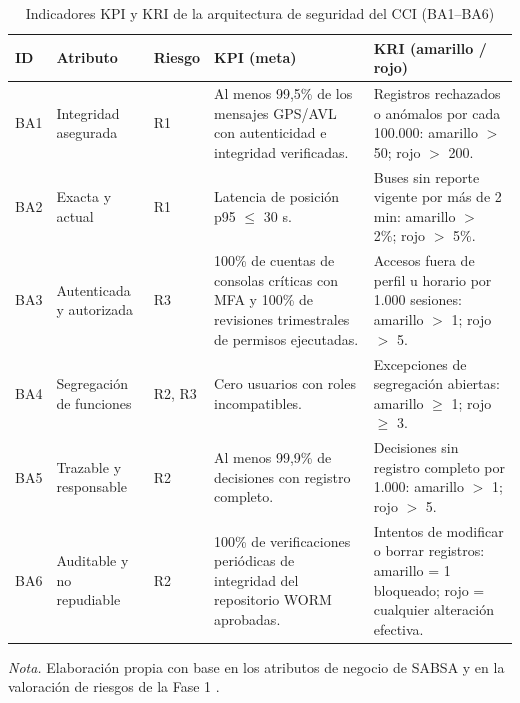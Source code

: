 \begin{table}[H]
	\centering
	\caption{Indicadores KPI y KRI de la arquitectura de seguridad del CCI (BA1--BA6)}
	\label{tab:kpi_kri_1}
	
	\begingroup
	\scriptsize
	\setlength{\tabcolsep}{3pt}
	\renewcommand{\arraystretch}{1.12}
	
	\begin{tabularx}{\textwidth}{
			>{\centering\arraybackslash}p{0.8cm}
			>{\raggedright\arraybackslash}p{2.0cm}
			>{\centering\arraybackslash}p{1.4cm}
			Y
			Y}
		
		\toprule
		\textbf{ID} &
		\textbf{Atributo} &
		\textbf{Riesgo} &
		\textbf{KPI (meta)} &
		\textbf{KRI (amarillo / rojo)} \\
		\midrule
		
		BA1 &
		Integridad asegurada &
		R1 &
		Al menos 99,5\% de los mensajes GPS/AVL con autenticidad e integridad verificadas. &
		Registros rechazados o anómalos por cada 100.000: amarillo $>$ 50; rojo $>$ 200. \\
		
		\addlinespace[2pt]
		
		BA2 &
		Exacta y actual &
		R1 &
		Latencia de posición p95 $\leq$ 30 s. &
		Buses sin reporte vigente por más de 2 min: amarillo $>$ 2\%; rojo $>$ 5\%. \\
		
		\addlinespace[2pt]
		
		BA3 &
		Autenticada y autorizada &
		R3 &
		100\% de cuentas de consolas críticas con MFA y 100\% de revisiones trimestrales
		de permisos ejecutadas. &
		Accesos fuera de perfil u horario por 1.000 sesiones: amarillo $>$ 1; rojo $>$ 5. \\
		
		\addlinespace[2pt]
		
		BA4 &
		Segregación de funciones &
		R2, R3 &
		Cero usuarios con roles incompatibles. &
		Excepciones de segregación abiertas: amarillo $\geq$ 1; rojo $\geq$ 3. \\
		
		\addlinespace[2pt]
		
		BA5 &
		Trazable y responsable &
		R2 &
		Al menos 99,9\% de decisiones con registro completo. &
		Decisiones sin registro completo por 1.000: amarillo $>$ 1; rojo $>$ 5. \\
		
		\addlinespace[2pt]
		
		BA6 &
		Auditable y no repudiable &
		R2 &
		100\% de verificaciones periódicas de integridad del repositorio WORM aprobadas. &
		Intentos de modificar o borrar registros: amarillo = 1 bloqueado; rojo = cualquier
		alteración efectiva. \\
		
		\bottomrule
	\end{tabularx}
	
	\vspace{0.4em}
	\parbox{\textwidth}{\footnotesize \textit{Nota.} Elaboración propia con base en los atributos de negocio de SABSA \parencite{sabsa2005,sabsaCCI2026} y en la valoración de riesgos de la Fase 1 \parencite{fase1cci2026}.}
	
	\endgroup
\end{table}


